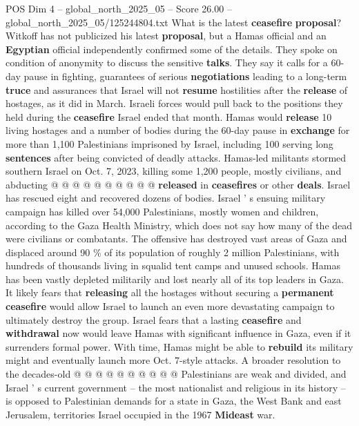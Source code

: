 \begin{textsample}{POS Dim 4 – global\_north\_2025\_05 – Score 26.00 – global\_north\_2025\_05/125244804.txt}
What is the latest \textbf{ceasefire} \textbf{proposal}?
Witkoff has not publicized his latest \textbf{proposal}, but a Hamas official and an \textbf{Egyptian} official independently confirmed some of the details.
They spoke on condition of anonymity to discuss the sensitive \textbf{talks}.
They say it calls for a 60-day pause in fighting, guarantees of serious \textbf{negotiations} leading to a long-term \textbf{truce} and assurances that Israel will not \textbf{resume} hostilities after the \textbf{release} of hostages, as it did in March.
Israeli forces would pull back to the positions they held during the \textbf{ceasefire} Israel ended that month.
Hamas would \textbf{release} 10 living hostages and a number of bodies during the 60-day pause in \textbf{exchange} for more than 1,100 Palestinians imprisoned by Israel, including 100 serving long \textbf{sentences} after being convicted of deadly attacks.
Hamas-led militants stormed southern Israel on Oct. 7, 2023, killing some 1,200 people, mostly civilians, and abducting @ @ @ @ @ @ @ @ @ @ \textbf{released} in \textbf{ceasefires} or other \textbf{deals}.
Israel has rescued eight and recovered dozens of bodies.
Israel ' s ensuing military campaign has killed over 54,000 Palestinians, mostly women and children, according to the Gaza Health Ministry, which does not say how many of the dead were civilians or combatants.
The offensive has destroyed vast areas of Gaza and displaced around 90 \% of its population of roughly 2 million Palestinians, with hundreds of thousands living in squalid tent camps and unused schools.
Hamas has been vastly depleted militarily and lost nearly all of its top leaders in Gaza.
It likely fears that \textbf{releasing} all the hostages without securing a \textbf{permanent} \textbf{ceasefire} would allow Israel to launch an even more devastating campaign to ultimately destroy the group.
Israel fears that a lasting \textbf{ceasefire} and \textbf{withdrawal} now would leave Hamas with significant influence in Gaza, even if it surrenders formal power.
With time, Hamas might be able to \textbf{rebuild} its military might and eventually launch more Oct. 7-style attacks.
A broader resolution to the decades-old @ @ @ @ @ @ @ @ @ @ Palestinians are weak and divided, and Israel ' s current government -- the most nationalist and religious in its history -- is opposed to Palestinian demands for a state in Gaza, the West Bank and east Jerusalem, territories Israel occupied in the 1967 \textbf{Mideast} war.

\end{textsample}
